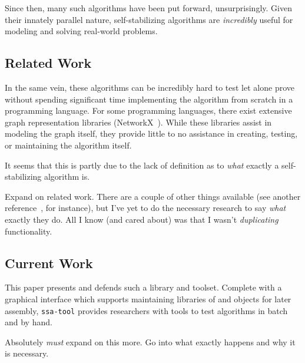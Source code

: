 Since then, many such algorithms have been put forward, unsurprisingly.
Given their innately parallel nature,
  self-stabilizing algorithms are \emph{incredibly} useful
  for modeling and solving real-world problems.

\subsection{Related Work}
\label{sec:introduction:related-work}
In the same vein, these algorithms can be incredibly hard to test
  \Dash let alone prove \Dash
  without spending significant time implementing the algorithm
  from scratch in a programming language.
For some programming languages,
  there exist extensive graph representation libraries (\eg NetworkX~\autocite{hagberg:networkx}).
While these libraries assist in modeling the graph itself,
  they provide little to no assistance in creating, testing, or maintaining the algorithm itself.

It seems that this is partly due to the lack of definition as to
  \emph{what} exactly a self-stabilizing algorithm is.

\begin{draftvspace}{5in}
  Expand on related work.
  There are a couple of other things available (see another reference~\autocite{lafon:libcircle}, for instance),
    but I've yet to do the necessary research to say \emph{what} exactly they do.
  All I know (and cared about) was that I wasn't \emph{duplicating} functionality.
\end{draftvspace}

\subsection{Current Work}
\label{sec:introduction:current-work}
This paper presents and defends such a library and toolset.
Complete with a graphical interface which supports
  maintaining libraries of  and  objects for later assembly,
  \texttt{ssa-tool} provides researchers with tools to test algorithms in batch and by hand.
\begin{draftvspace}{4in}
  Absolutely \emph{must} expand on this more.
  Go into what exactly happens and why it is necessary.
\end{draftvspace}

